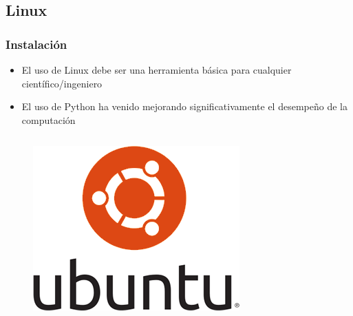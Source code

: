 \documentclass[10pt]{beamer}
\begin{document}
\subsection{Linux}
\begin{frame}
\frametitle{Instalaci\'on}

\begin{beamerboxesrounded}[upper=uppercolor, lower=lowercolor, shadow=true]{} 

\begin{itemize}
 \item El uso de Linux debe ser una herramienta b\'asica para cualquier cient\'ifico/ingeniero
 \item El uso de Python ha venido mejorando significativamente el desempe\~no de la computaci\'on
\end{itemize}
\end{beamerboxesrounded}

\begin{columns}

\hspace{-7mm}
\begin{column}{.3\textwidth}
\vspace{-3mm}
 \begin{figure}
 \includegraphics[scale=0.35]{./Figures/ubuntu.png} 
 \end{figure}
\end{column}%


\end{columns}
\end{frame}
\end{document}
